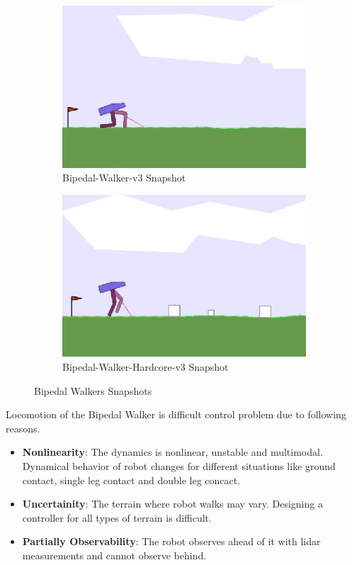 \begin{figure}
	\begin{subfigure}{.5\textwidth}
		\centering
		\includegraphics[width=0.9\linewidth]{figures/bipedal/classic.png}
		\caption{Bipedal-Walker-v3 Snapshot}
		\label{fig:bipedal_walker_classic}
	\end{subfigure}
	\begin{subfigure}{.5\textwidth}
		\centering
		\includegraphics[width=0.9\linewidth]{figures/bipedal/hardcore.png}
		\caption{Bipedal-Walker-Hardcore-v3 Snapshot}
		\label{fig:bipedal_walker_hardcore}
	\end{subfigure}
	\caption{Bipedal Walkers Snapshots}
	\label{fig:bipedal_walkers}
\end{figure}
Locomotion of the Bipedal Walker is difficult control problem due to following reasons. \\
\begin{itemize}
	\item \textbf{Nonlinearity}: The dynamics is nonlinear, unstable and multimodal. Dynamical behavior of robot changes for different situations like ground contact, single leg contact and double leg concact. 
	\item \textbf{Uncertainity}: The terrain where robot walks may vary. Designing a controller for all types of terrain is difficult.
	\item \textbf{Partially Observability}: The robot observes ahead of it with lidar measurements and cannot observe behind. 
\end{itemize}
